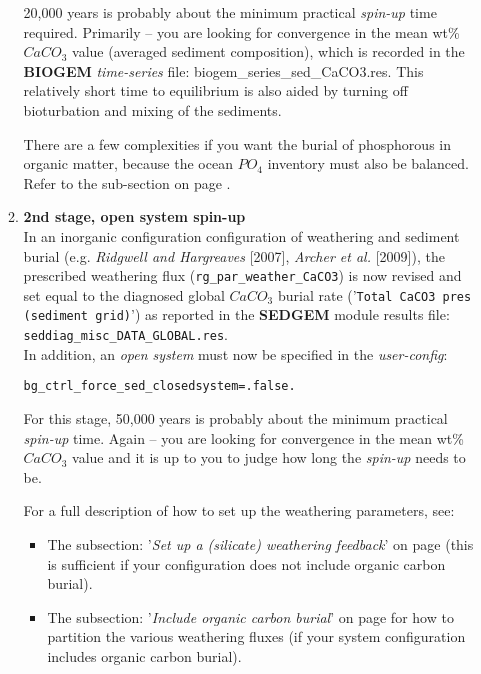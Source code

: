 \begin{enumerate}[noitemsep]
\begin{enumerate}
\vspace{1mm}
20,000 years is probably about the minimum practical \textit{spin-up} time required. Primarily -- you are looking for convergence in the mean wt\% \(CaCO_{3}\) value (averaged sediment composition), which is recorded in the \textbf{BIOGEM} \textit{time-series} file: \textsf{\footnotesize biogem\_series\_sed\_CaCO3.res}. This relatively short time to equilibrium is also aided by turning off bioturbation and mixing of the sediments.

\vspace{1mm}
There are a few complexities if you want the burial of phosphorous in organic matter, because the ocean \(PO_{4}\) inventory must also be balanced. Refer to the sub-section on page \pageref{subsec:specify_a_particular_carbonate_mineralogy}.

\vspace{2mm}
\item \textbf{2nd stage, open system spin-up}
\vspace{1mm}
\\In an inorganic configuration configuration of weathering and sediment burial (e.g. \textit{Ridgwell and Hargreaves} [2007], \textit{Archer et al.} [2009]), the  prescribed weathering flux (\texttt{rg\_par\_weather\_CaCO3}) is now revised and set equal to the diagnosed global \(CaCO_{3}\) burial rate ('\texttt{Total CaCO3 pres (sediment grid)}') as reported in the \textbf{SEDGEM} module results file: \texttt{seddiag\_misc\_DATA\_GLOBAL.res}.
\vspace{1mm}
\\In addition, an \textit{open system} must now be specified in the \textit{user-config}:
\vspace{-1mm}\small\begin{verbatim}
bg_ctrl_force_sed_closedsystem=.false.
\end{verbatim}\normalsize\vspace{-1mm}

\vspace{1mm}
\noindent For this stage, 50,000 years is probably about the minimum practical \textit{spin-up} time. Again -- you are looking for convergence in the mean wt\% \(CaCO_{3}\) value and it is up to you to judge how long the \textit{spin-up} needs to be.

\vspace{1mm}
For a full description of how to set up the weathering parameters, see:
\begin{itemize}[noitemsep]
\vspace{1mm}
\item The subsection: '\textit{Set up a (silicate) weathering feedback}' on page \pageref{subsec:set_up_a_weathering_feedback} (this is sufficient if your configuration does not include organic carbon burial).
\vspace{1mm}
\item The subsection: '\textit{Include organic carbon burial}' on page \pageref{subsec:include_organic_carbon_burial} for how to partition the various weathering fluxes (if your system configuration includes organic carbon burial).
\end{itemize}


\end{enumerate}
\end{enumerate}
